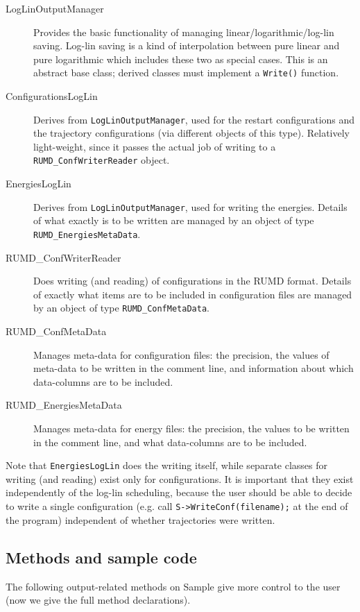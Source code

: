 \documentclass[a4paper]{article}
\begin{document}
\begin{description}
\item [LogLinOutputManager] Provides the basic functionality of managing 
linear/logarithmic/log-lin saving. Log-lin saving is a kind of interpolation 
between pure linear and pure logarithmic which includes these two as special
cases. This is an abstract base class; derived classes must 
implement a \verb|Write()| function.
\item [ConfigurationsLogLin] Derives from \verb|LogLinOutputManager|, used for
the restart configurations and the trajectory configurations (via different 
objects of this type). Relatively
light-weight, since it passes the actual job of writing to a
 \verb|RUMD_ConfWriterReader| object.
\item [EnergiesLogLin] Derives from \verb|LogLinOutputManager|, used for 
writing the
energies. Details of what exactly is to be written are managed by an object
of type \verb|RUMD_EnergiesMetaData|.
\item [RUMD\_ConfWriterReader] Does writing (and reading) of configurations in 
the RUMD format. Details of exactly what items are to be included in 
configuration files are managed by an object of type \verb|RUMD_ConfMetaData|.
\item [RUMD\_ConfMetaData] Manages meta-data for configuration files: the
 precision, the values of meta-data to be written in the comment line, and 
information about which data-columns are to be included.
\item [RUMD\_EnergiesMetaData] Manages meta-data for energy files: the 
precision, the values to be written in the comment line, and what data-columns
are to be included.
\end{description}


Note that \verb|EnergiesLogLin| does the writing itself, while
separate classes for writing (and reading) exist only for configurations. It
is important that they exist independently of the log-lin scheduling, because
the user should be able to decide to write a single configuration (e.g. call
\verb|S->WriteConf(filename);|
at the end of the program) independent of whether trajectories were written.


\subsection{Methods and sample code}

The following output-related methods on Sample give more control to the user
(now we give the full method declarations).
\end{document}
